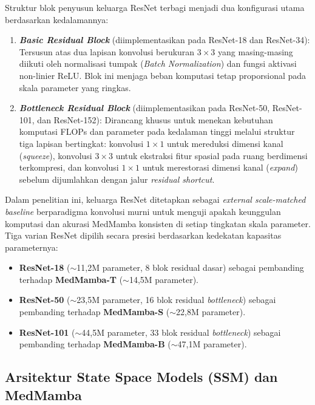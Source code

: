 Struktur blok penyusun keluarga ResNet terbagi menjadi dua konfigurasi utama berdasarkan kedalamannya:
\begin{enumerate}[noitemsep]
	\item \textbf{\textit{Basic Residual Block}} (diimplementasikan pada ResNet-18 dan ResNet-34): Tersusun atas dua lapisan konvolusi berukuran $3 \times 3$ yang masing-masing diikuti oleh normalisasi tumpak (\textit{Batch Normalization}) dan fungsi aktivasi non-linier ReLU. Blok ini menjaga beban komputasi tetap proporsional pada skala parameter yang ringkas.
	\item \textbf{\textit{Bottleneck Residual Block}} (diimplementasikan pada ResNet-50, ResNet-101, dan ResNet-152): Dirancang khusus untuk menekan kebutuhan komputasi FLOPs dan parameter pada kedalaman tinggi melalui struktur tiga lapisan bertingkat: konvolusi $1 \times 1$ untuk mereduksi dimensi kanal (\textit{squeeze}), konvolusi $3 \times 3$ untuk ekstraksi fitur spasial pada ruang berdimensi terkompresi, dan konvolusi $1 \times 1$ untuk merestorasi dimensi kanal (\textit{expand}) sebelum dijumlahkan dengan jalur \textit{residual shortcut}.
\end{enumerate}

Dalam penelitian ini, keluarga ResNet ditetapkan sebagai \textit{external scale-matched baseline} berparadigma konvolusi murni untuk menguji apakah keunggulan komputasi dan akurasi MedMamba konsisten di setiap tingkatan skala parameter. Tiga varian ResNet dipilih secara presisi berdasarkan kedekatan kapasitas parameternya:
\begin{itemize}[noitemsep]
	\item \textbf{ResNet-18} ($\sim$11,2M parameter, 8 blok residual dasar) sebagai pembanding terhadap \textbf{MedMamba-T} ($\sim$14,5M parameter).
	\item \textbf{ResNet-50} ($\sim$23,5M parameter, 16 blok residual \textit{bottleneck}) sebagai pembanding terhadap \textbf{MedMamba-S} ($\sim$22,8M parameter).
	\item \textbf{ResNet-101} ($\sim$44,5M parameter, 33 blok residual \textit{bottleneck}) sebagai pembanding terhadap \textbf{MedMamba-B} ($\sim$47,1M parameter).
\end{itemize}

\subsection{Arsitektur State Space Models (SSM) dan MedMamba} \label{II.Teori.MedMamba}
